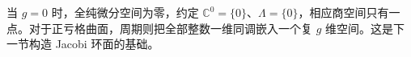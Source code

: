 \ProseParagraphBreak

当 \(g=0\) 时，全纯微分空间为零，约定 \(\mathbb C^0=\{0\}\)、\(\Lambda=\{0\}\)，相应商空间只有一点。对于正亏格曲面，周期则把全部整数一维同调嵌入一个复 \(g\) 维空间。这是下一节构造 Jacobi 环面的基础。
